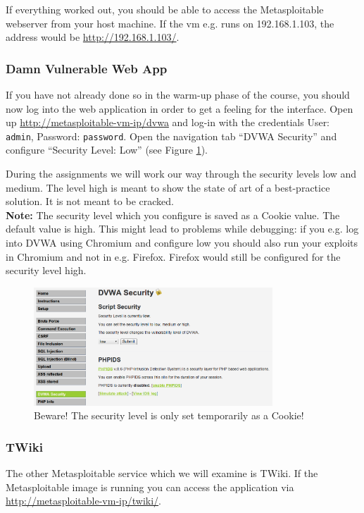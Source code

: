 \documentclass{report}
\begin{document}
If everything worked out, you should be able to access the Metasploitable 
webserver from your host machine. If the vm e.g. runs on 192.168.1.103,
the address would be \href{http://192.168.1.103/}{http://192.168.1.103/}.

\subsubsection{Damn Vulnerable Web App}
If you have not already done so in the warm-up phase of the course,
you should now log into the web application in order to get a feeling for 
the interface.
Open up \href{http://metasploitable-vm-ip/dvwa}{http://metasploitable-vm-ip/dvwa}
and log-in with the credentials User: \texttt{admin}, Password: 
\texttt{password}.
Open the navigation tab ``DVWA Security'' and configure ``Security Level: Low''
(see Figure \ref{fig:dvwa0}).

During the assignments we will work our way through the security levels 
low and medium. The level high is meant to show 
the state of art of a best-practice solution. It is not meant to be cracked.\\

\textbf{Note:} The security level which you configure is saved as a Cookie 
value. The default value is high. This might lead to problems
while debugging: if you e.g. log into DVWA using Chromium and configure
low you should also run your exploits in Chromium and not 
in e.g. Firefox. Firefox would still be configured for the security level
high.

\begin{figure}[h!]
	\centering
	\includegraphics[width=0.8\textwidth]
		{./images/dvwa-security.png}
	\caption{
		Beware! The security level is only set temporarily as a
		Cookie!
	}
	\label{fig:dvwa0}
\end{figure}

\subsubsection{TWiki}
The other Metasploitable service which we will examine is TWiki. If the
Metasploitable image is running you can access the application via 
\href{http://metasploitable-vm-ip/twiki}{http://metasploitable-vm-ip/twiki/}.
\end{document}
